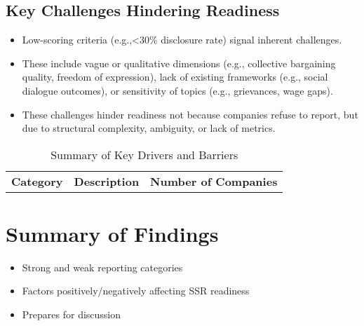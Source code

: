 \subsection{Key Challenges Hindering Readiness}
\begin{itemize}
    \item Low-scoring criteria (e.g.,<30\% disclosure rate) signal inherent challenges.       
    \item These include vague or qualitative dimensions (e.g., collective bargaining quality, freedom of expression), 
    lack of existing frameworks (e.g., social dialogue outcomes), or sensitivity of topics (e.g., grievances, wage gaps). 
     \item These challenges hinder readiness not because companies refuse to report, but due to structural complexity, 
     ambiguity, or lack of metrics.
\end{itemize}

\begin{table}[H]
    \centering
    \caption{Summary of Key Drivers and Barriers}
    \begin{tabular}{l l l}
        \textbf{Category} & \textbf{Description} & \textbf{Number of Companies} \\
    \end{tabular}
\end{table}

\section{Summary of Findings}
\begin{itemize}
    \item Strong and weak reporting categories
    \item Factors positively/negatively affecting SSR readiness
    \item Prepares for discussion
\end{itemize}
